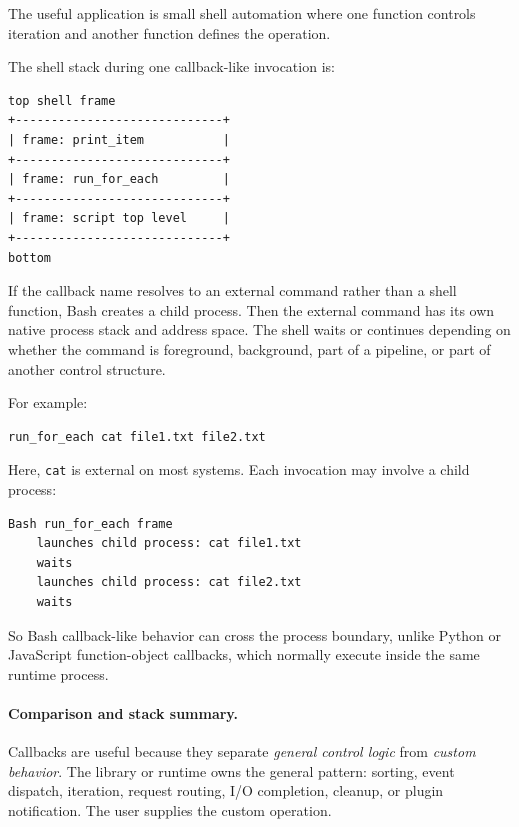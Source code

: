 The useful application is small shell automation where one function controls iteration and another function defines the operation.

The shell stack during one callback-like invocation is:

\begin{verbatim}
top shell frame
+-----------------------------+
| frame: print_item           |
+-----------------------------+
| frame: run_for_each         |
+-----------------------------+
| frame: script top level     |
+-----------------------------+
bottom
\end{verbatim}

If the callback name resolves to an external command rather than a shell function, Bash creates a child process. Then the external command has its own native process stack and address space. The shell waits or continues depending on whether the command is foreground, background, part of a pipeline, or part of another control structure.

For example:

\begin{verbatim}
run_for_each cat file1.txt file2.txt
\end{verbatim}

Here, \texttt{cat} is external on most systems. Each invocation may involve a child process:

\begin{verbatim}
Bash run_for_each frame
    launches child process: cat file1.txt
    waits
    launches child process: cat file2.txt
    waits
\end{verbatim}

So Bash callback-like behavior can cross the process boundary, unlike Python or JavaScript function-object callbacks, which normally execute inside the same runtime process.

\paragraph{Comparison and stack summary.}

Callbacks are useful because they separate \emph{general control logic} from \emph{custom behavior}. The library or runtime owns the general pattern: sorting, event dispatch, iteration, request routing, I/O completion, cleanup, or plugin notification. The user supplies the custom operation.

